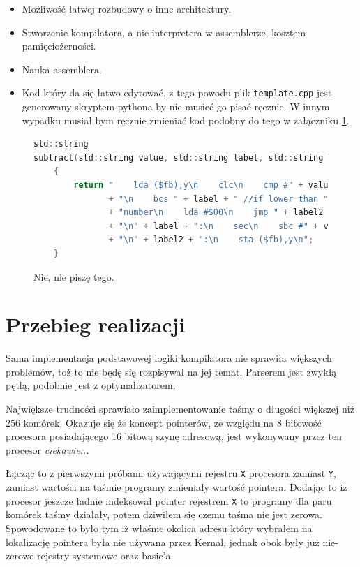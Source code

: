 \documentclass[a4paper,12pt]{article}
\begin{document}
    \begin{itemize}
        \item Możliwość łatwej rozbudowy o inne architektury.
        \item Stworzenie kompilatora, a nie interpretera w assemblerze, kosztem pamięciożerności.
        \item Nauka assemblera.
        \item Kod który da się łatwo edytować, z tego powodu plik \texttt{template.cpp} jest generowany skryptem pythona by nie musieć go pisać ręcznie. W innym wypadku musiał bym ręcznie zmieniać kod podobny do tego w załączniku \ref{crazycpp}.
    \end{itemize}

    \begin{figure}[h]
        \begin{lstlisting}[language=c,frame=L,basicstyle=\footnotesize\ttfamily]
std::string
subtract(std::string value, std::string label, std::string label2)
    {
        return "    lda ($fb),y\n    clc\n    cmp #" + value
               + "\n    bcs " + label + " //if lower than "
               + "number\n    lda #$00\n    jmp " + label2
               + "\n" + label + ":\n    sec\n    sbc #" + value
               + "\n" + label2 + ":\n    sta ($fb),y\n";
    }
        \end{lstlisting}
        \caption{Nie, nie piszę tego.}
        \label{crazycpp}
    \end{figure}

    \section{Przebieg realizacji}

    Sama implementacja podstawowej logiki kompilatora nie sprawiła większych problemów, toż to nie będę się rozpisywał na jej temat. Parserem jest zwykłą pętlą, podobnie jest z optymalizatorem.

    Największe trudności sprawiało zaimplementowanie taśmy o długości większej niż 256 komórek. Okazuje się że koncept pointerów, ze względu na 8 bitowość procesora posiadającego 16 bitową szynę adresową, jest wykonywany przez ten procesor \emph{ciekawie...}

    Łącząc to z pierwszymi próbami używającymi rejestru \texttt{X} procesora zamiast \texttt{Y}, zamiast wartości na taśmie programy zmieniały wartość pointera. Dodając to iż procesor jeszcze ładnie indeksował pointer rejestrem \texttt{X} to programy dla paru komórek taśmy działały, potem dziwiłem się czemu taśma nie jest zerowa. Spowodowane to było tym iż właśnie okolica adresu który wybrałem na lokalizację pointera była nie używana przez Kernal, jednak obok były już nie-zerowe rejestry systemowe oraz basic'a.
\end{document}
